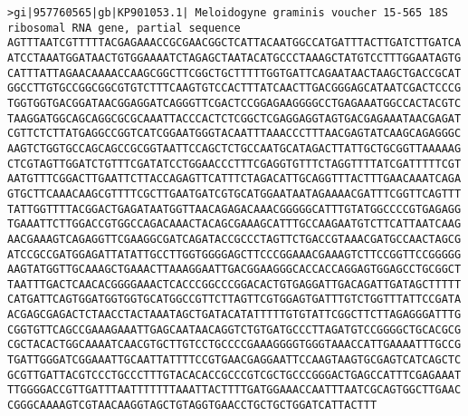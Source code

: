 \documentclass[11pt]{article}
\begin{document}
\begin{Verbatim}[commandchars=\\\{\}]
>gi|957760565|gb|KP901053.1| Meloidogyne graminis voucher 15-565 18S ribosomal RNA gene, partial sequence
AGTTTAATCGTTTTTACGAGAAACCGCGAACGGCTCATTACAATGGCCATGATTTACTTGATCTTGATCA
ATCCTAAATGGATAACTGTGGAAAATCTAGAGCTAATACATGCCCTAAAGCTATGTCCTTTGGAATAGTG
CATTTATTAGAACAAAACCAAGCGGCTTCGGCTGCTTTTTGGTGATTCAGAATAACTAAGCTGACCGCAT
GGCCTTGTGCCGGCGGCGTGTCTTTCAAGTGTCCACTTTATCAACTTGACGGGAGCATAATCGACTCCCG
TGGTGGTGACGGATAACGGAGGATCAGGGTTCGACTCCGGAGAAGGGGCCTGAGAAATGGCCACTACGTC
TAAGGATGGCAGCAGGCGCGCAAATTACCCACTCTCGGCTCGAGGAGGTAGTGACGAGAAATAACGAGAT
CGTTCTCTTATGAGGCCGGTCATCGGAATGGGTACAATTTAAACCCTTTAACGAGTATCAAGCAGAGGGC
AAGTCTGGTGCCAGCAGCCGCGGTAATTCCAGCTCTGCCAATGCATAGACTTATTGCTGCGGTTAAAAAG
CTCGTAGTTGGATCTGTTTCGATATCCTGGAACCCTTTCGAGGTGTTTCTAGGTTTTATCGATTTTTCGT
AATGTTTCGGACTTGAATTCTTACCAGAGTTCATTTCTAGACATTGCAGGTTTACTTTGAACAAATCAGA
GTGCTTCAAACAAGCGTTTTCGCTTGAATGATCGTGCATGGAATAATAGAAAACGATTTCGGTTCAGTTT
TATTGGTTTTACGGACTGAGATAATGGTTAACAGAGACAAACGGGGGCATTTGTATGGCCCCGTGAGAGG
TGAAATTCTTGGACCGTGGCCAGACAAACTACAGCGAAAGCATTTGCCAAGAATGTCTTCATTAATCAAG
AACGAAAGTCAGAGGTTCGAAGGCGATCAGATACCGCCCTAGTTCTGACCGTAAACGATGCCAACTAGCG
ATCCGCCGATGGAGATTATATTGCCTTGGTGGGGAGCTTCCCGGAAACGAAAGTCTTCCGGTTCCGGGGG
AAGTATGGTTGCAAAGCTGAAACTTAAAGGAATTGACGGAAGGGCACCACCAGGAGTGGAGCCTGCGGCT
TAATTTGACTCAACACGGGGAAACTCACCCGGCCCGGACACTGTGAGGATTGACAGATTGATAGCTTTTT
CATGATTCAGTGGATGGTGGTGCATGGCCGTTCTTAGTTCGTGGAGTGATTTGTCTGGTTTATTCCGATA
ACGAGCGAGACTCTAACCTACTAAATAGCTGATACATATTTTTGTGTATTCGGCTTCTTAGAGGGATTTG
CGGTGTTCAGCCGAAAGAAATTGAGCAATAACAGGTCTGTGATGCCCTTAGATGTCCGGGGCTGCACGCG
CGCTACACTGGCAAAATCAACGTGCTTGTCCTGCCCCGAAAGGGGTGGGTAAACCATTGAAAATTTGCCG
TGATTGGGATCGGAAATTGCAATTATTTTCCGTGAACGAGGAATTCCAAGTAAGTGCGAGTCATCAGCTC
GCGTTGATTACGTCCCTGCCCTTTGTACACACCGCCCGTCGCTGCCCGGGACTGAGCCATTTCGAGAAAT
TTGGGGACCGTTGATTTAATTTTTTTAAATTACTTTTGATGGAAACCAATTTAATCGCAGTGGCTTGAAC
CGGGCAAAAGTCGTAACAAGGTAGCTGTAGGTGAACCTGCTGCTGGATCATTACTTT


\end{Verbatim}
\end{document}
